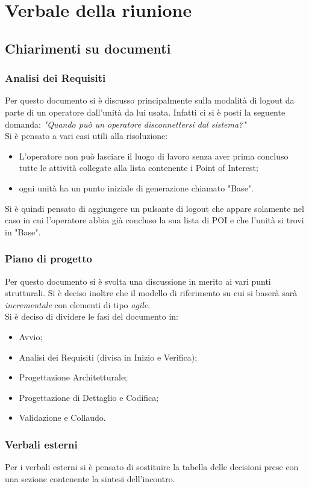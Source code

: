 \section{Verbale della riunione}
\subsection{Chiarimenti su documenti}
\subsubsection{Analisi dei Requisiti}
Per questo documento si è discusso principalmente sulla modalità di logout da parte di un operatore dall'unità da lui usata. Infatti ci si è posti la seguente domanda: \textit{"Quando può un operatore disconnettersi dal sistema?"}\\
Si è pensato a vari casi utili alla risoluzione:
\begin{itemize}
	\item L'operatore non può lasciare il luogo di lavoro senza aver prima concluso tutte le attività collegate alla lista contenente i Point of Interest;
	\item ogni unità ha un punto iniziale di generazione chiamato "Base".
\end{itemize}
Si è quindi pensato di aggiungere un pulsante di logout che appare solamente nel caso in cui l'operatore abbia già concluso la sua lista di POI e che l'unità si trovi in "Base".

\subsubsection{Piano di progetto}
Per questo documento si è svolta una discussione in merito ai vari punti strutturali. Si è deciso inoltre che il modello di riferimento su cui si baserà sarà \textit{incrementale} con elementi di tipo \textit{agile}.\\
Si è deciso di dividere le fasi del documento in:
\begin{itemize}
	\item Avvio;
	\item Analisi dei Requisiti (divisa in Inizio e Verifica);
	\item Progettazione Architetturale;
	\item Progettazione di Dettaglio e Codifica;
	\item Validazione e Collaudo.
\end{itemize}

\subsubsection{Verbali esterni}
Per i verbali esterni si è pensato di sostituire la tabella delle decisioni prese con una sezione contenente la sintesi dell'incontro.

